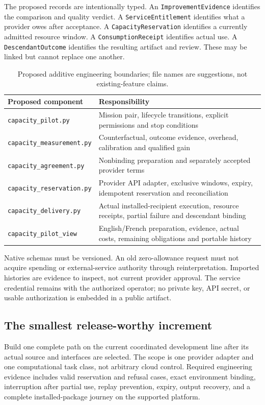 \documentclass[11pt,letterpaper]{article}
\theoremstyle{remark}\newtheorem{remark}{Remark}[section]
\begin{document}
The proposed records are intentionally typed. An \texttt{ImprovementEvidence} identifies the comparison and quality verdict. A \texttt{ServiceEntitlement} identifies what a provider owes after acceptance. A \texttt{CapacityReservation} identifies a currently admitted resource window. A \texttt{ConsumptionReceipt} identifies actual use. A \texttt{DescendantOutcome} identifies the resulting artifact and review. These may be linked but cannot replace one another.

\begin{table}[htbp]\centering\small
\caption{Proposed additive engineering boundaries; file names are suggestions, not existing-feature claims.}\label{tab:modules}
\begin{tabularx}{\linewidth}{@{}P{.38\linewidth}Y@{}}\toprule
Proposed component & Responsibility\\\midrule
\texttt{capacity\_pilot.py} & Mission pair, lifecycle transitions, explicit permissions and stop conditions\\
\texttt{capacity\_measurement.py} & Counterfactual, outcome evidence, overhead, calibration and qualified gain\\
\texttt{capacity\_agreement.py} & Nonbinding preparation and separately accepted provider terms\\
\texttt{capacity\_reservation.py} & Provider API adapter, exclusive windows, expiry, idempotent reservation and reconciliation\\
\texttt{capacity\_delivery.py} & Actual installed-recipient execution, resource receipts, partial failure and descendant binding\\
\texttt{capacity\_pilot\_view} & English/French preparation, evidence, actual costs, remaining obligations and portable history\\\bottomrule
\end{tabularx}
\end{table}

Native schemas must be versioned. An old zero-allowance request must not acquire spending or external-service authority through reinterpretation. Imported histories are evidence to inspect, not current provider approval. The service credential remains with the authorized operator; no private key, API secret, or usable authorization is embedded in a public artifact.

\subsection{The smallest release-worthy increment}
Build one complete path on the current coordinated development line after its actual source and interfaces are selected. The scope is one provider adapter and one computational task class, not arbitrary cloud control. Required engineering evidence includes valid reservation and refusal cases, exact environment binding, interruption after partial use, replay prevention, expiry, output recovery, and a complete installed-package journey on the supported platform.
\end{document}

